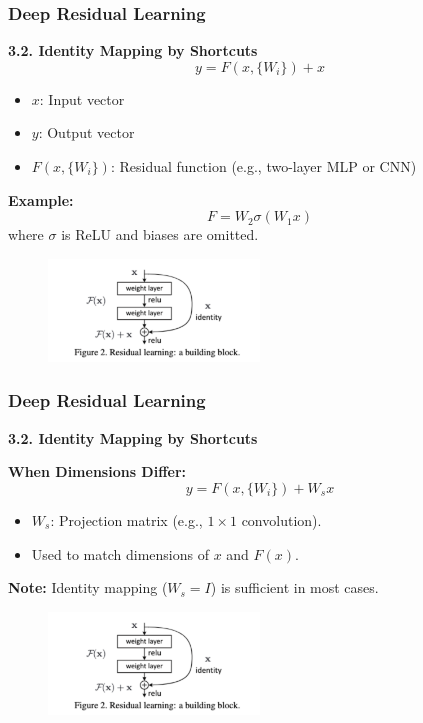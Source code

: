 \documentclass[
	11pt, %
]{beamer}
\begin{document}
\begin{frame}
    \frametitle{Deep Residual Learning}

    \textbf{3.2. Identity Mapping by Shortcuts}
    \begin{equation}
        y = F(x, \{W_i\}) + x
    \end{equation}
    \vspace{-2mm}
    \begin{itemize}
        \item $x$: Input vector
        \item $y$: Output vector
        \item $F(x, \{W_i\})$: Residual function (e.g., two-layer MLP or CNN)
    \end{itemize}
    \vspace{2mm}
    \textbf{Example:}
    \[
        F = W_2 \sigma(W_1 x)
    \]
    where $\sigma$ is ReLU and biases are omitted.

	\begin{figure}
		\centering
		\includegraphics[width=0.5\textwidth]{./images/Screenshot 2025-05-20 at 0.19.36.png}
	\end{figure}
\end{frame}

\begin{frame}
    \frametitle{Deep Residual Learning}

    \textbf{3.2. Identity Mapping by Shortcuts}

    \textbf{When Dimensions Differ:}
    \begin{equation}
        y = F(x, \{W_i\}) + W_s x
    \end{equation}

    \begin{itemize}
        \item $W_s$: Projection matrix (e.g., $1 \times 1$ convolution).
        \item Used to match dimensions of $x$ and $F(x)$.
    \end{itemize}

    \textbf{Note:} Identity mapping ($W_s = I$) is sufficient in most cases.

	\begin{figure}
		\centering
		\includegraphics[width=0.5\textwidth]{./images/Screenshot 2025-05-20 at 0.19.36.png}
	\end{figure}
\end{frame}
\end{document}
